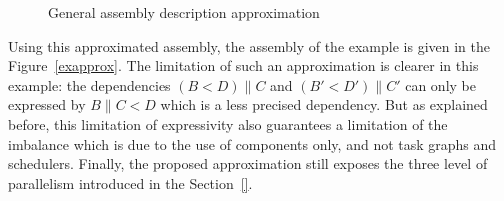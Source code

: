 
\begin{figure}[h!]
\begin{center}
\caption{General assembly description approximation}
\label{approx}
\end{center}
\end{figure}

Using this approximated assembly, the assembly of the example is given in the Figure~\ref{exapprox}. The limitation of such an approximation is clearer in this example: the dependencies $(B<D) \parallel C$ and $(B'<D') \parallel C'$ can only be expressed by $B \parallel C<D$ which is a less precised dependency. But as explained before, this limitation of expressivity also guarantees a limitation of the imbalance which is due to the use of components only, and not task graphs and schedulers. Finally, the proposed approximation still exposes the three level of parallelism introduced in the Section~\ref{}.%

